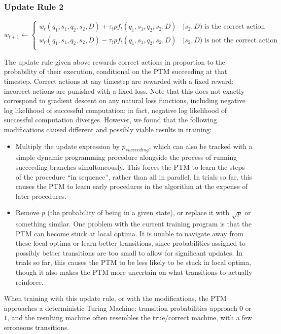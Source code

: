 \documentclass{article}
\begin{document}
\subsubsection{Update Rule 2}

\[ w_{t+1}\leftarrow 
\begin{cases}
    w_t(q_1, s_1, q_2, s_2, D) + \tau_tpf_t(q_1, s_1, q_2, s_2, D) & \text{($s_2, D$) is the correct action}\\
    w_t(q_1, s_1, q_2, s_2, D) - \tau_tpf_t(q_1, s_1, q_2, s_2, D) & \text{($s_2, D$) is not the correct action}\\
\end{cases}
\]

The update rule given above rewards correct actions in proportion to the probability of their execution, conditional on the PTM succeeding at that timestep. Correct actions at any timestep are rewarded with a fixed reward; incorrect actions are punished with a fixed loss. Note that this does not exactly correspond to gradient descent on any natural loss functions, including negative log likelihood of successful computation; in fact, negative log likelihood of successful computation diverges. However, we found that the following modifications caused different and possibly viable results in training:
\begin{itemize}
    \item Multiply the update expression by $p_{succeeding}$, which can also be tracked with a simple dynamic programming procedure alongside the process of running succeeding branches simultaneously. This forces the PTM to learn the steps of the procedure ``in sequence'', rather than all in parallel. In trials so far, this causes the PTM to learn early procedures in the algorithm at the expense of later procedures.
    \item Remove $p$ (the probability of being in a given state), or replace it with $\sqrt{p}$ or something similar. One problem with the current training program is that the PTM can become stuck at local optima. It is unable to navigate away from these local optima or learn better transitions, since probabilities assigned to possibly better transitions are too small to allow for significant updates. In trials so far, this causes the PTM to be less likely to be stuck in local optima, though it also makes the PTM more uncertain on what transitions to actually reinforce.
\end{itemize}
When training with this update rule, or with the modifications, the PTM approaches a deterministic Turing Machine: transition probabilities approach $0$ or $1$, and the resulting machine often resembles the true/correct machine, with a few erroneous transitions.
\end{document}
